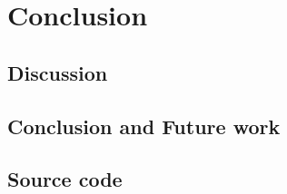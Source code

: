 \documentclass[UKenglish]{ifimaster}
\begin{document}
\part{Conclusion}
\chapter{Discussion}
\label{chapter:discussion}


\chapter{Conclusion and Future work}
\label{chapter:conclusion}


\backmatter{}
\printbibliography

\begin{appendices}
\chapter{Source code}
\label{appendix:source_code}



\end{appendices}
\end{document}
